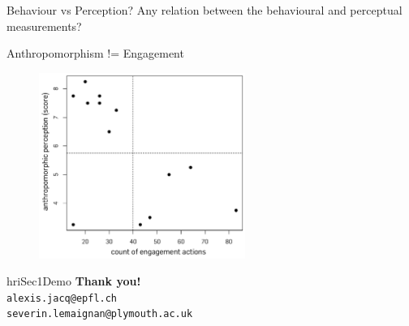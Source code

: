 \documentclass[compress]{beamer}
\begin{document}
\begin{frame}{Behaviour vs Perception?}
    \centering
    Any relation between the behavioural and perceptual measurements?

\end{frame}

{
\begin{frame}{Anthropomorphism != Engagement}

\begin{figure}
    \hspace*{5cm}\includegraphics[width=0.6\textwidth]{domino-correlation}
\end{figure}
\end{frame}
}



{
\begin{frame}[plain]

\begin{beamercolorbox}[wd=\linewidth,ht=6ex,dp=0.7ex]{hriSec1Demo}
    \textbf{Thank you!}\\
    \scriptsize
    {\tt alexis.jacq@epfl.ch}\\
    {\tt severin.lemaignan@plymouth.ac.uk}
\end{beamercolorbox}
    \vfill

\end{frame}
}
\end{document}
